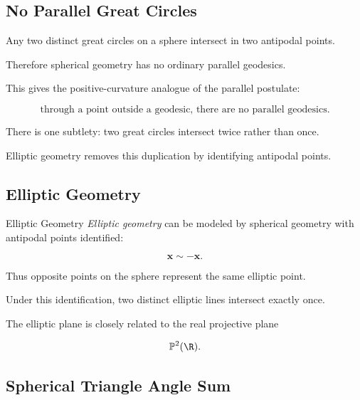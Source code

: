\subsection{No Parallel Great Circles}
\label{subsec:no-parallel-great-circles}

Any two distinct great circles on a sphere intersect in two antipodal
points.

Therefore spherical geometry has no ordinary parallel geodesics.

This gives the positive-curvature analogue of the parallel postulate:

\[
\boxed{
\text{through a point outside a geodesic, there are no parallel geodesics.}
}
\]

There is one subtlety: two great circles intersect twice rather than once.

Elliptic geometry removes this duplication by identifying antipodal points.

\subsection{Elliptic Geometry}
\label{subsec:elliptic-geometry}

\begin{definitionbox}{Elliptic Geometry}
\emph{Elliptic geometry} can be modeled by spherical geometry with antipodal
points identified:

\[
\boxed{
\mathbf{x}\sim-\mathbf{x}.
}
\]
\end{definitionbox}

Thus opposite points on the sphere represent the same elliptic point.

Under this identification, two distinct elliptic lines intersect exactly
once.

The elliptic plane is closely related to the real projective plane

\[
\mathbb{P}^{2}(\R).
\]

\subsection{Spherical Triangle Angle Sum}
\label{subsec:spherical-triangle-angle-sum}

